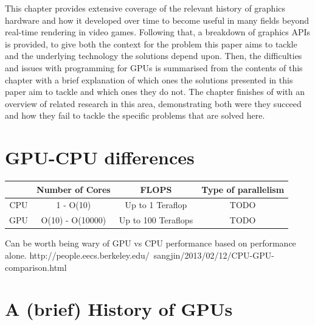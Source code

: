 \documentclass[a4paper,12pt,twoside,openright]{report}
\begin{document}
This chapter provides extensive coverage of the relevant history of graphics
hardware and how it developed over time to become useful in many fields beyond
real-time rendering in video games. Following that, a breakdown of graphics
APIs is provided, to give both the context for the problem this paper aims to
tackle and the underlying technology the solutions depend upon. Then, the
difficulties and issues with programming for GPUs is summarised from the
contents of this chapter with a brief explanation of which ones the solutions
presented in this paper aim to tackle and which ones they do not. The chapter
finishes of with an overview of related research in this area, demonstrating
both were they succeed and how they fail to tackle the specific problems that
are solved here.


\section{GPU-CPU differences}



\begin{center}
\begin{tabular}{||c||c|c|c||}
\hline
        & Number of Cores  & FLOPS                                         & Type of parallelism \\
\hline
\hline
CPU     & 1 - O(10)        & Up to 1 Teraflop \cite{IntelTeraFlop}         & TODO                \\
\hline
GPU     & O(10) - O(10000) & Up to 100 Teraflops \cite{NVIDIA100TeraFlops} & TODO                \\
\hline
\end{tabular}
\end{center}

Can be worth being wary of GPU vs CPU performance based on performance alone.
http://people.eecs.berkeley.edu/~sangjin/2013/02/12/CPU-GPU-comparison.html



\section{A (brief) History of GPUs}

\label{sec:history_gpu}
\end{document}
